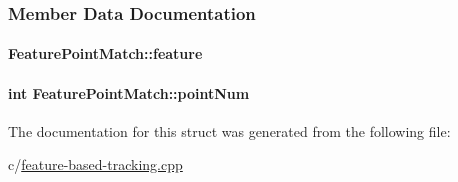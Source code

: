 \subsubsection{Member Data Documentation}
\hypertarget{structFeaturePointMatch_a6e06f2f1b6d2984ef2afac0692d3ed0b}{
\paragraph[{feature}]{ Feature\-Point\-Match\-::feature}}\label{structFeaturePointMatch_a6e06f2f1b6d2984ef2afac0692d3ed0b}
\hypertarget{structFeaturePointMatch_a47d4b687c08251210f789ce992b7d387}{
\paragraph[{point\-Num}]{\setlength{\rightskip}{0pt plus 5cm}int Feature\-Point\-Match\-::point\-Num}}\label{structFeaturePointMatch_a47d4b687c08251210f789ce992b7d387}


The documentation for this struct was generated from the following file\-:\begin{DoxyCompactItemize}
\item 
c/\hyperlink{feature-based-tracking_8cpp}{feature-\/based-\/tracking.\-cpp}\end{DoxyCompactItemize}
